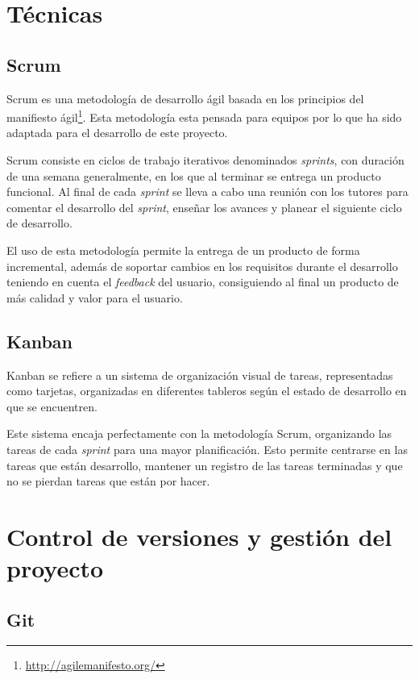 
\section{Técnicas}

\subsection{Scrum}

Scrum es una metodología de desarrollo ágil basada en los principios del
manifiesto ágil\footnote{\url{http://agilemanifesto.org/}}. Esta metodología
esta pensada para equipos por lo que ha sido adaptada para el desarrollo de este
proyecto.

Scrum consiste en ciclos de trabajo iterativos denominados \textit{sprints}, con
duración de una semana generalmente, en los que al terminar se entrega un
producto funcional. Al final de cada \textit{sprint} se lleva a cabo una reunión
con los tutores para comentar el desarrollo del \textit{sprint}, enseñar los
avances y planear el siguiente ciclo de desarrollo.

El uso de esta metodología permite la entrega de un producto de forma
incremental, además de soportar cambios en los requisitos durante el desarrollo
teniendo en cuenta el \textit{feedback} del usuario, consiguiendo al final un
producto de más calidad y valor para el usuario.

\subsection{Kanban}

Kanban se refiere a un sistema de organización visual de tareas, representadas
como tarjetas, organizadas en diferentes tableros según el estado de desarrollo
en que se encuentren.

Este sistema encaja perfectamente con la metodología Scrum, organizando las
tareas de cada \textit{sprint} para una mayor planificación. Esto permite
centrarse en las tareas que están desarrollo, mantener un registro de las tareas
terminadas y que no se pierdan tareas que están por hacer.

\section{Control de versiones y gestión del proyecto}

\subsection{Git}

